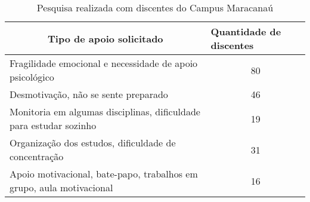 \begin{table}[!ht]
\caption{Pesquisa realizada com discentes do Campus Maracanaú}
\label{tablePesquisa}
\begin{tabular}{|l|c|}
\hline
\multicolumn{1}{|c|}{Tipo de apoio solicitado}                       & \multicolumn{1}{l|}{Quantidade de discentes} \\ \hline
Fragilidade emocional e necessidade de apoio psicológico             & 80                                           \\ \hline
Desmotivação, não se sente preparado                                 & 46                                           \\ \hline
Monitoria em algumas disciplinas, dificuldade para estudar sozinho   & 19                                           \\ \hline
Organização dos estudos, dificuldade de concentração                 & 31                                           \\ \hline
Apoio motivacional, bate-papo, trabalhos em grupo, aula motivacional & 16                                           \\ \hline
\end{tabular}
\end{table}
